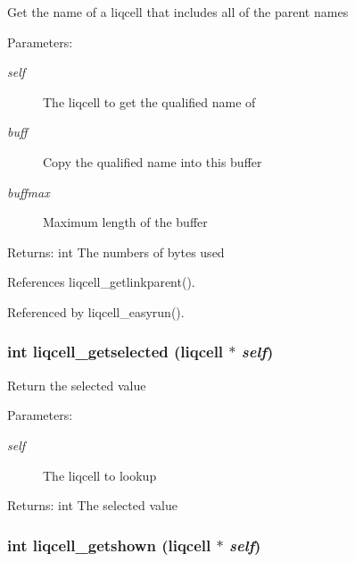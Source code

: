 Get the name of a liqcell that includes all of the parent names \begin{Desc}
\item[Parameters:]
\begin{description}
\item[{\em self}]The liqcell to get the qualified name of \item[{\em buff}]Copy the qualified name into this buffer \item[{\em buffmax}]Maximum length of the buffer \end{description}
\end{Desc}
\begin{Desc}
\item[Returns:]int The numbers of bytes used \end{Desc}


References liqcell\_\-getlinkparent().

Referenced by liqcell\_\-easyrun().
\subsubsection[{liqcell\_\-getselected}]{\setlength{\rightskip}{0pt plus 5cm}int liqcell\_\-getselected (liqcell $\ast$ {\em self})}\label{d5/da2/liqcell_8c_61b6c0b395afa1c6fd0f48104f288a05}


Return the selected value \begin{Desc}
\item[Parameters:]
\begin{description}
\item[{\em self}]The liqcell to lookup \end{description}
\end{Desc}
\begin{Desc}
\item[Returns:]int The selected value \end{Desc}
\subsubsection[{liqcell\_\-getshown}]{\setlength{\rightskip}{0pt plus 5cm}int liqcell\_\-getshown (liqcell $\ast$ {\em self})}\label{d5/da2/liqcell_8c_c9cdeee7b2d86ecae2fff7f9cafa1e89}


